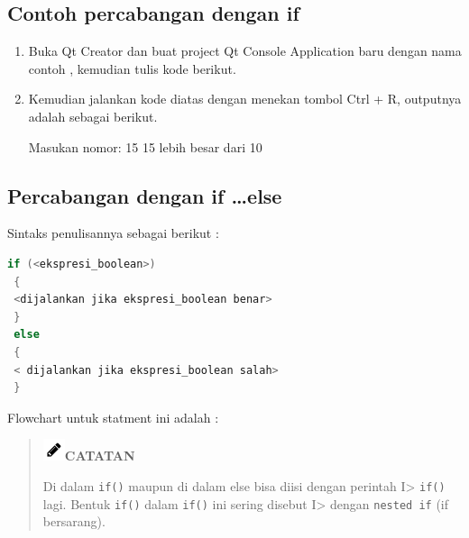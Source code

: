 \subsection*{Contoh percabangan dengan if}

\begin{enumerate}
	\item  Buka Qt Creator dan buat project Qt Console Application baru dengan
	nama contoh , kemudian tulis kode berikut.
	
	
	
	\item  Kemudian jalankan kode diatas dengan menekan tombol Ctrl + R, outputnya adalah sebagai berikut.
	
\begin{lcverbatim}
Masukan nomor: 15
15 lebih besar dari 10
\end{lcverbatim}
\end{enumerate}
\subsection{Percabangan dengan if \dots else}\label{percabangan-dengan-if-..-else}

Sintaks penulisannya sebagai berikut :

\begin{lstlisting}[language=c++]
 if (<ekspresi_boolean>)
 {
 <dijalankan jika ekspresi_boolean benar>
 }
 else
 {
 < dijalankan jika ekspresi_boolean salah>
 }
\end{lstlisting}

Flowchart untuk statment ini adalah :

\begin{quotation}
\includegraphics{../manuscript/images/pencil}\textbf{CATATAN} 

Di
dalam \texttt{if()} maupun di dalam else bisa diisi dengan perintah
I\textgreater{} \texttt{if()} lagi. Bentuk \texttt{if()} dalam
\texttt{if()} ini sering disebut I\textgreater{} dengan
\texttt{nested\ if} (if bersarang).
\end{quotation}



